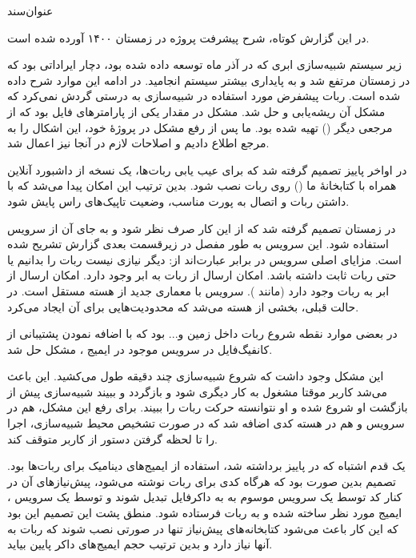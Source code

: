 \documentclass{cake-classes/short-report-fa}
\newcommand{\کیک}{مجموعهٔ کیکْ روباتیک}
\begin{document}
‌عنوان‌سند

در این گزارش کوتاه، شرح پیشرفت پروژه در زمستان ۱۴۰۰ آورده شده است.

زیر سیستم شبیه‌سازی ابری که در آذر ماه توسعه داده شده بود، دچار ایراداتی بود که در زمستان مرتفع شد و به پایداری بیشتر سیستم انجامید. در ادامه این موارد شرح داده شده است.
ربات پیشفرض مورد استفاده در شبیه‌سازی به درستی گردش نمی‌کرد که مشکل آن ریشه‌یابی و حل شد. مشکل در مقدار یکی از پارامترهای فایل  بود که از مرجعی دیگر () تهیه شده بود. ما پس از رفع مشکل در پروژهٔ خود، این اشکال را به مرجع اطلاع دادیم و اصلاحات لازم در آنجا نیز اعمال شد.

در اواخر پاییز تصمیم گرفته شد که برای عیب یابی ربات‌ها، یک نسخه از داشبورد آنلاین  همراه با کتابخانهٔ ما () روی ربات نصب شود. بدین ترتیب این امکان پیدا می‌شد که با داشتن  ربات و اتصال به پورت مناسب، وضعیت تاپیک‌های راس پایش شود.

در زمستان تصمیم گرفته شد که از این کار صرف نظر شود و به جای آن از سرویس  استفاده شود. این سرویس به طور مفصل در زیرقسمت بعدی گزارش تشریح شده است. مزایای اصلی سرویس  در برابر  عبارت‌اند از:
 دیگر نیازی نیست  ربات را بدانیم یا حتی ربات  ثابت داشته باشد.
 امکان ارسال  از ربات به ابر وجود دارد.
 امکان ارسال  از ابر به ربات وجود دارد (مانند ).
 سرویس  با معماری جدید از هسته مستقل است. در حالت قبلی،  بخشی از هسته می‌شد که محدودیت‌هایی برای آن ایجاد می‌کرد.

در بعضی موارد نقطه شروع ربات داخل زمین و... بود که با اضافه نمودن پشتیبانی از کانفیگ‌فایل در سرویس  موجود در ایمیج ، مشکل حل شد.

این مشکل وجود داشت که شروع شبیه‌سازی چند دقیقه طول می‌کشید. این باعث می‌شد کاربر موقتا مشغول به کار دیگری شود و بازگردد و ببیند شبیه‌سازی پیش از بازگشت او شروع شده و او نتوانسته حرکت ربات را ببیند. برای رفع این مشکل، هم در سرویس  و هم در هسته کدی اضافه شد که در صورت تشخیص محیط شبیه‌سازی، اجرا را تا لحظه گرفتن دستور از کاربر متوقف کند.

یک قدم اشتباه که در پاییز برداشته شد، استفاده از ایمیج‌های دینامیک برای ربات‌ها بود. تصمیم بدین صورت بود که هرگاه کدی برای ربات نوشته می‌شود، پیش‌نیازهای آن در کنار کد توسط یک سرویس موسوم به  به داکرفایل تبدیل شوند و توسط یک سرویس ، ایمیج مورد نظر ساخته شده و به ربات فرستاده شود. منطق پشت این تصمیم این بود که این کار باعث می‌شود کتابخانه‌های پیش‌نیاز تنها در صورتی نصب شوند که ربات به آنها نیاز دارد و بدین ترتیب حجم ایمیج‌های داکر پایین بیاید.
\end{document}
